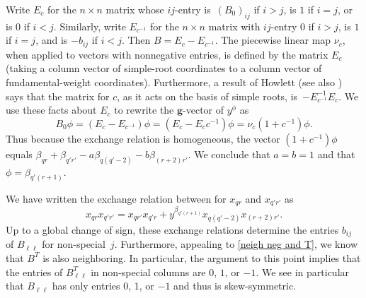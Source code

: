 \documentclass{amsart}
\theoremstyle{definition}
\theoremstyle{remark}
\numberwithin{equation}{section}
\newcommand{\0}{{\mathbf{0}}}
\newcommand{\g}{\mathbf{g}}
\newcommand{\SimplesTChar}{\Xi}
\newcommand{\SuppT}{\operatorname{Supp}_\SimplesTChar}
\begin{document}
Write $E_c$ for the $n\times n$ matrix whose $ij$-entry is~$(B_0)_{ij}$ if $i>j$, is $1$ if $i=j$, or is $0$ if $i<j$.
Similarly, write $E_{c^{-1}}$ for the $n\times n$ matrix with $ij$-entry $0$ if $i>j$, is $1$ if $i=j$, and is $-b_{ij}$ if $i<j$.
Then $B=E_c-E_{c^{-1}}$.
The piecewise linear map $\nu_c$, when applied to vectors with nonnegative entries, is defined by the matrix $E_c$ (taking a column vector of simple-root coordinates to a column vector of fundamental-weight coordinates).
Furthermore, a result of Howlett \cite[Theorem~2.1]{Howlett} (see also \cite[Theorem~2.6]{affdenom}) says that the matrix for $c$, as it acts on the basis of simple roots, is~$-E_{c^{-1}}^{-1}E_c$.
We use these facts about $E_c$ to rewrite the $\g$-vector of $y^\phi$ as 
\[B_0\phi=(E_c-E_{c^{-1}})\phi=(E_c-E_cc^{-1})\phi=\nu_c(1+c^{-1})\phi.\]
Thus because the exchange relation is homogeneous, the vector $(1+c^{-1})\phi$ equals $\beta_{qr}+\beta_{q'r'}-a\beta_{q(q'-2)}-b\beta_{(r+2)r'}$.
We conclude that $a=b=1$ and that $\phi=\beta_{q'(r+1)}$.

We have written the exchange relation between for $x_{qr}$ and $x_{q'r'}$ as 
\[x_{qr}x_{q'r'}=x_{qr'}x_{q'r}+y^{\beta_{q'(r+1)}}x_{q(q'-2)}x_{(r+2)r'}.\]
Up to a global change of sign, these exchange relations determine the entries $b_{ij}$ of $B_{\ell\ell}$ for non-special~$j$.
Furthermore, appealing to \cref{neigh neg and T}, we know that $B^T$ is also neighboring.
In particular, the argument to this point implies that the entries of $B_{\ell\ell}^T$ in non-special columns are $0$, $1$, or $-1$.
We see in particular that $B_{\ell\ell}$ has only entries $0$, $1$, or $-1$ and thus is skew-symmetric. %

%
%
\end{document}
